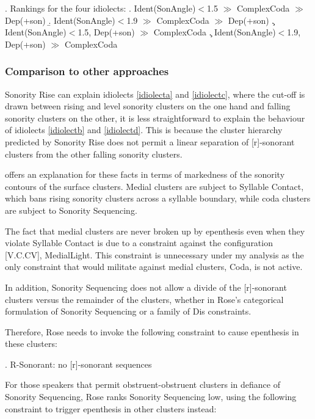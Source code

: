 \documentclass[12pt]{article}
\begin{document}
\ex. Rankings for the four idiolects:
     \a. {\sc Ident(SonAngle)}$<$1.5 $\gg$ {\sc *ComplexCoda} $\gg$ {\sc Dep}(+son)
     \b. {\sc Ident(SonAngle)}$<$1.9 $\gg$ {\sc *ComplexCoda} $\gg$ {\sc Dep}(+son)
     \c. {\sc Ident(SonAngle)}$<$1.5, {\sc Dep}(+son) $\gg$ {\sc *ComplexCoda}
     \c. {\sc Ident(SonAngle)}$<$1.9, {\sc Dep}(+son) $\gg$ {\sc *ComplexCoda}

\subsubsection{Comparison to other approaches}

{\sc Sonority Rise} can explain idiolects \ref{idiolecta} and \ref{idiolectc}, where the cut-off is drawn between rising and level sonority clusters on the one hand and falling sonority clusters on the other, it is less straightforward to explain the behaviour of idiolects \ref{idiolectb} and \ref{idiolectd}. This is because the cluster hierarchy predicted by {\sc Sonority Rise} does not permit a linear separation of [r]-sonorant clusters from the other falling sonority clusters.


\bigskip

\citet{rose.2000} offers an explanation for these facts in terms of markedness of the sonority contours of the surface clusters. Medial clusters are subject to Syllable Contact, which bans rising sonority clusters across a syllable boundary, while coda clusters are subject to Sonority Sequencing.

The fact that medial clusters are never broken up by epenthesis even when they violate Syllable Contact is due to a constraint against the configuration [V.C.CV], {\sc *MedialLight}. This constraint is unnecessary under my analysis as the only constraint that would militate against medial clusters, {\sc *Coda}, is not active.

In addition, Sonority Sequencing does not allow a divide of the [r]-sonorant clusters versus the remainder of the clusters, whether in Rose's categorical formulation of Sonority Sequencing or a family of {\sc *Dis} constraints.


Therefore, Rose needs to invoke the following constraint to cause epenthesis in these clusters:

\ex. {\sc *R-Sonorant}: no [r]-sonorant sequences \citep[(41)]{rose.2000}

For those speakers that permit obstruent-obstruent clusters in defiance of Sonority Sequencing, Rose ranks Sonority Sequencing low, using the following constraint to trigger epenthesis in other clusters instead:
\end{document}

